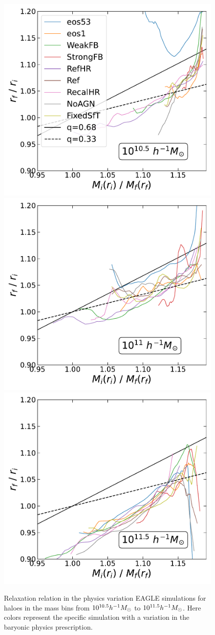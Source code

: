 \begin{figure}[htbp]
\centering
\includegraphics[width=0.32\linewidth]{plots/eagle_physvar_rad_indep_relxn_reln_MiMf_10.5.pdf}
\includegraphics[width=0.32\linewidth]{plots/eagle_physvar_rad_indep_relxn_reln_MiMf_11.pdf}
\includegraphics[width=0.32\linewidth]{plots/eagle_physvar_rad_indep_relxn_reln_MiMf_11.5.pdf}
\caption{Relaxation relation in the physics variation EAGLE simulations for haloes in the mass bins from $10^{10.5} h^{-1}M_{\odot}$ to $10^{11.5} h^{-1}M_{\odot}$. Here colors represent the specific simulation with a variation in the baryonic physics prescription.}
\label{fig:EAGLE-rad-indep}
\end{figure}

